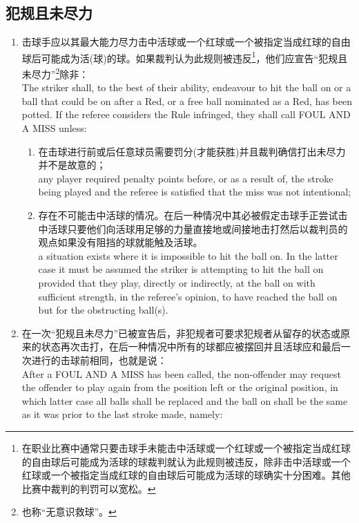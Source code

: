 \subsection{犯规且未尽力}\label{22314}

\begin{enumerate}[label=(\alph*)]
    \item \label{22314a}击球手应以其最大能力尽力击中活球或一个红球或一个被指定当成红球的自由球后可能成为活(球)的球。如果裁判认为此规则被违反\footnote{在职业比赛中通常只要击球手未能击中活球或一个红球或一个被指定当成红球的自由球后可能成为活球的球裁判就认为此规则被违反，除非击中活球或一个红球或一个被指定当成红球的自由球后可能成为活球的球确实十分困难。其他比赛中裁判的判罚可以宽松。}，他们应宣告``犯规且未尽力''\footnote{也称``无意识救球''。}除非：\\
    The striker shall, to the best of their ability, endeavour to hit the ball on or a ball that could be on after a Red, or a free ball nominated as a Red, has been potted. If the referee considers the Rule infringed, they shall call FOUL AND A MISS unless:
    \begin{enumerate}[label=(\roman*)]
        \item \label{22314ai}在击球进行前或后任意球员需要罚分(才能获胜)并且裁判确信打出未尽力并不是故意的；\\
        any player required penalty points before, or as a result of, the stroke being played and the referee is satisfied that the miss was not intentional;
        \item 存在不可能击中活球的情况。在后一种情况中其必被假定击球手正尝试击中活球只要他们向活球用足够的力量直接地或间接地击打然后以裁判员的观点如果没有阻挡的球就能触及活球。\\
        a situation exists where it is impossible to hit the ball on. In the latter case it must be assumed the striker is attempting to hit the ball on provided that they play, directly or indirectly, at the ball on with sufficient strength, in the referee's opinion, to have reached the ball on but for the obstructing ball(s). 
    \end{enumerate}
    \item \label{22314b}在一次``犯规且未尽力''已被宣告后，非犯规者可要求犯规者从留存的状态或原来的状态再次击打，在后一种情况中所有的球都应被摆回并且活球应和最后一次进行的击球前相同，也就是说：\\
    After a FOUL AND A MISS has been called, the non-offender may request the offender to play again from the position left or the original position, in which latter case all balls shall be replaced and the ball on shall be the same as it was prior to the last stroke made, namely: 

\end{enumerate}
